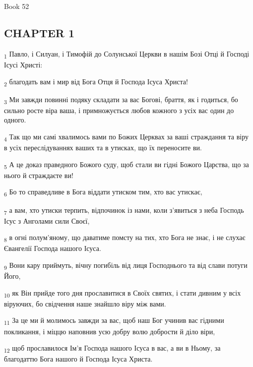 Book 52
\subsection{CHAPTER 1}
\begin{tcolorbox}
\textsubscript{1} Павло, і Силуан, і Тимофій до Солунської Церкви в нашім Бозі Отці й Господі Ісусі Христі:
\end{tcolorbox}
\begin{tcolorbox}
\textsubscript{2} благодать вам і мир від Бога Отця й Господа Ісуса Христа!
\end{tcolorbox}
\begin{tcolorbox}
\textsubscript{3} Ми завжди повинні подяку складати за вас Богові, браття, як і годиться, бо сильно росте віра ваша, і примножується любов кожного з усіх вас один до одного.
\end{tcolorbox}
\begin{tcolorbox}
\textsubscript{4} Так що ми самі хвалимось вами по Божих Церквах за ваші страждання та віру в усіх переслідуваннях ваших та в утисках, що їх переносите ви.
\end{tcolorbox}
\begin{tcolorbox}
\textsubscript{5} А це доказ праведного Божого суду, щоб стали ви гідні Божого Царства, що за нього й страждаєте ви!
\end{tcolorbox}
\begin{tcolorbox}
\textsubscript{6} Бо то справедливе в Бога віддати утиском тим, хто вас утискає,
\end{tcolorbox}
\begin{tcolorbox}
\textsubscript{7} а вам, хто утиски терпить, відпочинок із нами, коли з'явиться з неба Господь Ісус з Анголами сили Своєї,
\end{tcolorbox}
\begin{tcolorbox}
\textsubscript{8} в огні полум'яному, що даватиме помсту на тих, хто Бога не знає, і не слухає Євангелії Господа нашого Ісуса.
\end{tcolorbox}
\begin{tcolorbox}
\textsubscript{9} Вони кару приймуть, вічну погибіль від лиця Господнього та від слави потуги Його,
\end{tcolorbox}
\begin{tcolorbox}
\textsubscript{10} як Він прийде того дня прославитися в Своїх святих, і стати дивним у всіх віруючих, бо свідчення наше знайшло віру між вами.
\end{tcolorbox}
\begin{tcolorbox}
\textsubscript{11} За це ми й молимось завжди за вас, щоб наш Бог учинив вас гідними покликання, і міццю наповнив усю добру волю добрости й діло віри,
\end{tcolorbox}
\begin{tcolorbox}
\textsubscript{12} щоб прославилося Ім'я Господа нашого Ісуса в вас, а ви в Ньому, за благодаттю Бога нашого й Господа Ісуса Христа.
\end{tcolorbox}
